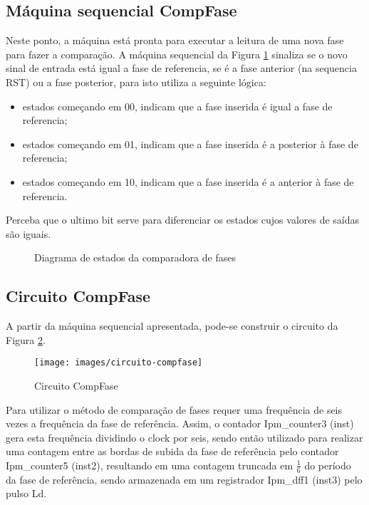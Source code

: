 \subsection{Máquina sequencial CompFase}

Neste ponto, a máquina está pronta para executar a leitura de uma nova fase para fazer a comparação. A máquina sequencial da Figura \ref{fig:comp-fase} sinaliza se o novo sinal de entrada está igual a fase de referencia, se é a fase anterior (na sequencia RST) ou a fase posterior, para isto utiliza a seguinte lógica:
\begin{itemize}
	\item estados começando em 00, indicam que a fase inserida é igual a fase de referencia;
	\item estados começando em 01, indicam que a fase inserida é a posterior à fase de referencia;
	\item estados começando em 10, indicam que a fase inserida é a anterior à fase de referencia.
\end{itemize}

Perceba que o ultimo bit serve para diferenciar os estados cujos valores de saídas são iguais.

\begin{figure}[!htp]
	\centering
	\caption{Diagrama de estados da comparadora de fases}
	\label{fig:comp-fase}
\end{figure}

\subsection{Circuito CompFase}

A partir da máquina sequencial apresentada, pode-se construir o circuito da Figura \ref{fig:circuito-compfase}.

\begin{figure}[!htp]
	\centering
	\caption{Circuito CompFase}
	\texttt{[image: images/circuito-compfase]}	\label{fig:circuito-compfase}
\end{figure}

Para utilizar o método de comparação de fases requer uma frequência de seis vezes a frequência da fase de referência. Assim, o contador Ipm\_counter3 (inst) gera esta frequência dividindo o clock por seis, sendo então utilizado para realizar uma contagem entre as bordas de subida da fase de referência pelo contador Ipm\_counter5 (inst2), resultando em uma contagem truncada em $\frac{1}{6}$ do período da fase de referência, sendo armazenada em um registrador Ipm\_dff1 (inst3) pelo pulso Ld.


